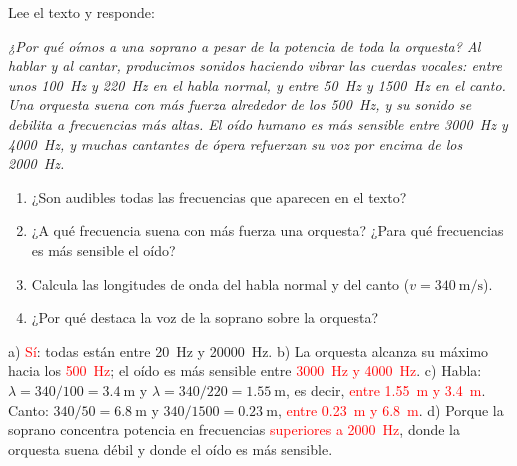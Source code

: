 \begin{exercise}
    Lee el texto y responde:
    \begin{marker}
        \emph{¿Por qué oímos a una soprano a pesar de la potencia de toda la orquesta? Al hablar y al cantar, producimos sonidos haciendo vibrar las cuerdas vocales: entre unos \qty{100}{\hertz} y \qty{220}{\hertz} en el habla normal, y entre \qty{50}{\hertz} y \qty{1500}{\hertz} en el canto. Una orquesta suena con más fuerza alrededor de los \qty{500}{\hertz}, y su sonido se debilita a frecuencias más altas. El oído humano es más sensible entre \qty{3000}{\hertz} y \qty{4000}{\hertz}, y muchas cantantes de ópera refuerzan su voz por encima de los \qty{2000}{\hertz}.}
    \end{marker}
    \begin{enumerate}[label=\alph*)]
        \item ¿Son audibles todas las frecuencias que aparecen en el texto?
        \item ¿A qué frecuencia suena con más fuerza una orquesta? ¿Para qué frecuencias es más sensible el oído?
        \item Calcula las longitudes de onda del habla normal y del canto (\(v = \qty{340}{\m\per\s}\)).
        \item ¿Por qué destaca la voz de la soprano sobre la orquesta?
    \end{enumerate}
    \begin{solu}
        a) \textcolor{red}{Sí}: todas están entre \qty{20}{\hertz} y \qty{20000}{\hertz}.
        b) La orquesta alcanza su máximo hacia los \textcolor{red}{\qty{500}{\hertz}}; el oído es más sensible entre \textcolor{red}{\qty{3000}{\hertz} y \qty{4000}{\hertz}}.
        c) Habla: \(\lambda = 340/100 = \qty{3.4}{\m}\) y \(\lambda = 340/220 = \qty{1.55}{\m}\), es decir, \textcolor{red}{entre \qty{1.55}{\m} y \qty{3.4}{\m}}. Canto: \(340/50 = \qty{6.8}{\m}\) y \(340/1500 = \qty{0.23}{\m}\), \textcolor{red}{entre \qty{0.23}{\m} y \qty{6.8}{\m}}.
        d) Porque la soprano concentra potencia en frecuencias \textcolor{red}{superiores a \qty{2000}{\hertz}}, donde la orquesta suena débil y donde el oído es más sensible.
    \end{solu}
\end{exercise}

